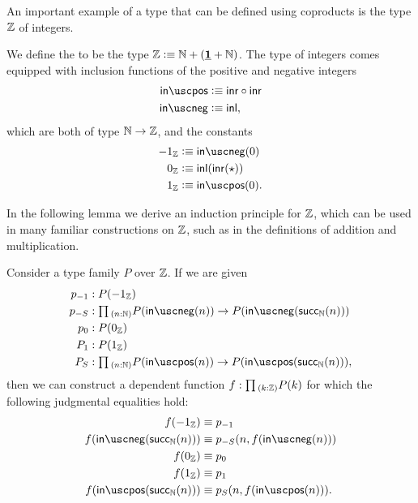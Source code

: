 An important example of a type that can be defined using coproducts is the type ${\mathbb{Z}}$ of integers.

\begin{defn}
  We define the  to be the type ${\mathbb{Z}}\vcentcolon\equiv{\mathbb{N}}+(\underline{\mathbf{1}}+{\mathbb{N}})$. The type of integers comes equipped with inclusion functions of the positive and negative integers
  \begin{align*}
    \inpos & \defeq \inr\circ\inr \\
    \inneg & \defeq \inl,
  \end{align*}
  which are both of type ${\mathbb{N}}\to{\mathbb{Z}}$, and the constants
  \begin{align*}
    -1_\Z & \defeq \inneg(0)\\
    0_\Z & \defeq \inl(\inr(\ttt))\\
    1_\Z & \defeq \inpos(0).
  \end{align*}
\end{defn}

In the following lemma we derive an induction principle for ${\mathbb{Z}}$, which can be used in many familiar constructions on ${\mathbb{Z}}$, such as in the definitions of addition and multiplication.

\begin{lem}\label{lem:Z_ind}
  Consider a type family $P$ over ${\mathbb{Z}}$. If we are given
  \begin{align*}
    p_{-1} & :P(-1_\Z) \\
    p_{-S} & : \prd{n:\N}P(\inneg(n))\to P(\inneg(\succN(n)))\\
    p_{0} & : P(0_\Z) \\
    P_{1} & : P(1_\Z) \\
    P_{S} & : \prd{n:\N}P(\inpos(n))\to P(\inpos(\succN(n))),
  \end{align*}
  then we can construct a dependent function $f:\prd{k:\Z}P(k)$ for which the following judgmental equalities hold:
  \begin{align*}
    f(-1_\Z) & \jdeq p_{-1} \\
    f(\inneg(\mathsf{succ}_\N(n))) & \jdeq p_{-S}(n,f(\inneg(n))) \\
    f(0_\Z) & \jdeq p_{0} \\
    f(1_\Z) & \jdeq p_{1} \\
    f(\inpos(\mathsf{succ}_\N(n))) & \jdeq p_S(n,f(\inpos(n))).
  \end{align*}
\end{lem}

